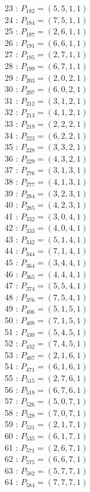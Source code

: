 \documentclass{article}
\begin{document}
{\begin{multicols}{3}
23 : $P_{182}=( 5, 5, 1, 1 )$\\
24 : $P_{184}=( 7, 5, 1, 1 )$\\
25 : $P_{187}=( 2, 6, 1, 1 )$\\
26 : $P_{191}=( 6, 6, 1, 1 )$\\
27 : $P_{195}=( 2, 7, 1, 1 )$\\
28 : $P_{199}=( 6, 7, 1, 1 )$\\
29 : $P_{203}=( 2, 0, 2, 1 )$\\
30 : $P_{207}=( 6, 0, 2, 1 )$\\
31 : $P_{212}=( 3, 1, 2, 1 )$\\
32 : $P_{213}=( 4, 1, 2, 1 )$\\
33 : $P_{219}=( 2, 2, 2, 1 )$\\
34 : $P_{223}=( 6, 2, 2, 1 )$\\
35 : $P_{228}=( 3, 3, 2, 1 )$\\
36 : $P_{229}=( 4, 3, 2, 1 )$\\
37 : $P_{276}=( 3, 1, 3, 1 )$\\
38 : $P_{277}=( 4, 1, 3, 1 )$\\
39 : $P_{284}=( 3, 2, 3, 1 )$\\
40 : $P_{285}=( 4, 2, 3, 1 )$\\
41 : $P_{332}=( 3, 0, 4, 1 )$\\
42 : $P_{333}=( 4, 0, 4, 1 )$\\
43 : $P_{342}=( 5, 1, 4, 1 )$\\
44 : $P_{344}=( 7, 1, 4, 1 )$\\
45 : $P_{364}=( 3, 4, 4, 1 )$\\
46 : $P_{365}=( 4, 4, 4, 1 )$\\
47 : $P_{374}=( 5, 5, 4, 1 )$\\
48 : $P_{376}=( 7, 5, 4, 1 )$\\
49 : $P_{406}=( 5, 1, 5, 1 )$\\
50 : $P_{408}=( 7, 1, 5, 1 )$\\
51 : $P_{430}=( 5, 4, 5, 1 )$\\
52 : $P_{432}=( 7, 4, 5, 1 )$\\
53 : $P_{467}=( 2, 1, 6, 1 )$\\
54 : $P_{471}=( 6, 1, 6, 1 )$\\
55 : $P_{515}=( 2, 7, 6, 1 )$\\
56 : $P_{519}=( 6, 7, 6, 1 )$\\
57 : $P_{526}=( 5, 0, 7, 1 )$\\
58 : $P_{528}=( 7, 0, 7, 1 )$\\
59 : $P_{531}=( 2, 1, 7, 1 )$\\
60 : $P_{535}=( 6, 1, 7, 1 )$\\
61 : $P_{571}=( 2, 6, 7, 1 )$\\
62 : $P_{575}=( 6, 6, 7, 1 )$\\
63 : $P_{582}=( 5, 7, 7, 1 )$\\
64 : $P_{584}=( 7, 7, 7, 1 )$\\
\end{multicols}


}
\end{document}
